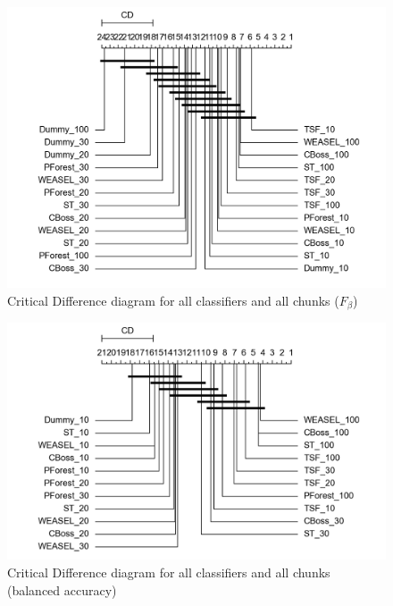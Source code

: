   \begin{figure} [!htb]
    \centering
    \includegraphics[width=\textwidth]{./Chapters/06 Results/cd_f_score_all_pct_all_clf_dummy.png}
    \caption{Critical Difference diagram for all classifiers and all chunks ($F_{\beta}$)}
  \end{figure}

  \begin{figure} [!htb]
    \centering
    \includegraphics[width=\textwidth]{./Chapters/06 Results/cd_accuracy_all_pct_all_clf_dummy.png}
    \caption{Critical Difference diagram for all classifiers and all chunks (balanced accuracy)}
  \end{figure}

